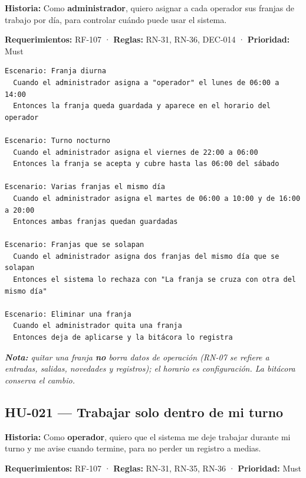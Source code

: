 \textbf{Historia:} Como \textbf{administrador}, quiero asignar a cada operador sus franjas de trabajo por día, para controlar cuándo puede usar el sistema.


\textbf{Requerimientos:} RF-107 · \textbf{Reglas:} RN-31, RN-36, DEC-014 · \textbf{Prioridad:} Must


\begin{lstlisting}[style=gherkin]
Escenario: Franja diurna
  Cuando el administrador asigna a "operador" el lunes de 06:00 a 14:00
  Entonces la franja queda guardada y aparece en el horario del operador

Escenario: Turno nocturno
  Cuando el administrador asigna el viernes de 22:00 a 06:00
  Entonces la franja se acepta y cubre hasta las 06:00 del sábado

Escenario: Varias franjas el mismo día
  Cuando el administrador asigna el martes de 06:00 a 10:00 y de 16:00 a 20:00
  Entonces ambas franjas quedan guardadas

Escenario: Franjas que se solapan
  Cuando el administrador asigna dos franjas del mismo día que se solapan
  Entonces el sistema lo rechaza con "La franja se cruza con otra del mismo día"

Escenario: Eliminar una franja
  Cuando el administrador quita una franja
  Entonces deja de aplicarse y la bitácora lo registra
\end{lstlisting}

\textit{\textbf{Nota:} quitar una franja \textbf{no} borra datos de operación (RN-07 se refiere a entradas, salidas, novedades y registros); el horario es configuración. La bitácora conserva el cambio.}


\subsection{HU-021 — Trabajar solo dentro de mi turno}

\textbf{Historia:} Como \textbf{operador}, quiero que el sistema me deje trabajar durante mi turno y me avise cuando termine, para no perder un registro a medias.


\textbf{Requerimientos:} RF-107 · \textbf{Reglas:} RN-31, RN-35, RN-36 · \textbf{Prioridad:} Must


